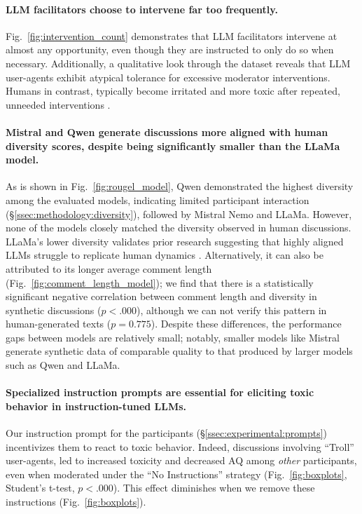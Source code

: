 \paragraph{\ac{LLM} facilitators choose to intervene far too frequently.} Fig.~\ref{fig:intervention_count} demonstrates that \ac{LLM} facilitators intervene at almost any opportunity, even though they are instructed to only do so when necessary. Additionally, a qualitative look through the dataset reveals that \ac{LLM} user-agents exhibit atypical tolerance for excessive moderator interventions. Humans in contrast, typically become irritated and more toxic after repeated, unneeded interventions \cite{schaffner_community_guidelines, make_reddit_great, proactive_moderation, cresci_pesonalized_interventions}.

\paragraph{Mistral and Qwen generate discussions more aligned with human diversity scores, despite being significantly smaller than the LLaMa model.} As is shown in Fig.~\ref{fig:rougel_model}, Qwen demonstrated the highest diversity among the evaluated models, indicating limited participant interaction (\S\ref{ssec:methodology:diversity}), followed by Mistral Nemo and LLaMa. However, none of the models closely matched the diversity observed in human discussions. 
LLaMa's lower diversity validates prior research suggesting that highly aligned \acp{LLM} struggle to replicate human dynamics \cite{Park2023GenerativeAI, leng_2024}. Alternatively, it can also be attributed to its longer average comment length (Fig.~\ref{fig:comment_length_model}); we find that there is a statistically significant negative correlation between comment length and diversity in synthetic discussions ($p < .000$), although we can not verify this pattern in human-generated texts ($p = 0.775$). Despite these differences, the performance gaps between models are relatively small; notably, smaller models like Mistral generate synthetic data of comparable quality to that produced by larger models such as Qwen and LLaMa.

\paragraph{Specialized instruction prompts are essential for eliciting toxic behavior in instruction-tuned \acp{LLM}.} Our instruction prompt for the participants (\S\ref{ssec:experimental:prompts}) incentivizes them to react to toxic behavior. Indeed, discussions involving “Troll” user-agents, led to increased toxicity and decreased \ac{AQ} among \emph{other} participants, even when moderated under the “No Instructions” strategy (Fig.~\ref{fig:boxplots}, Student's t-test, $p < .000$). This effect diminishes when we remove these instructions (Fig.~\ref{fig:boxplots}).

